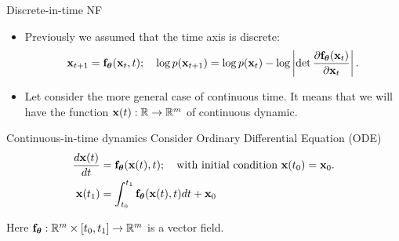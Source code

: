 \begin{frame}{Discrete-in-time NF}
	\begin{itemize}
		\item Previously we assumed that the time axis is discrete:
		\vspace{-0.3cm}
		 \[
		 	 \mathbf{x}_{t+1} = \mathbf{f}_{\boldsymbol{\theta}}(\mathbf{x}_t, t); \quad \log p(\mathbf{x}_{t+1}) = \log p(\mathbf{x}_{t}) - \log \left| \det \frac{\partial \mathbf{f}_{\boldsymbol{\theta}}(\mathbf{x}_t)}{\partial \mathbf{x}_{t}} \right| .
		 \]
		\item Let consider the more general case of continuous time. It means that we will have the function $\mathbf{x}(t): \mathbb{R} \rightarrow \mathbb{R}^m$ of continuous dynamic.
	\end{itemize}
	\begin{block}{Continuous-in-time dynamics}
		Consider Ordinary Differential Equation (ODE)
		\vspace{-0.3cm}
		\begin{align*}
		   \frac{d \mathbf{x}(t)}{dt} &= \mathbf{f}_{\boldsymbol{\theta}}(\mathbf{x}(t), t); \quad \text{with initial condition }\mathbf{x}(t_0) = \mathbf{x}_0. \\
		   \mathbf{x}(t_1) &= \int^{t_1}_{t_0} \mathbf{f}_{\boldsymbol{\theta}}(\mathbf{x}(t), t) d t  + \mathbf{x}_0
		\end{align*}
		\vspace{-0.6cm}
	\end{block}
	Here $\mathbf{f}_{\boldsymbol{\theta}}: \mathbb{R}^m \times [t_0, t_1] \rightarrow \mathbb{R}^m$ is a vector field.
\end{frame}
